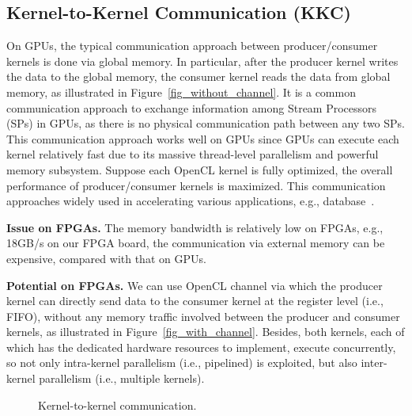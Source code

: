 \vspace{-1ex}
\subsection{Kernel-to-Kernel Communication (KKC)}
On GPUs, the typical communication approach between producer/consumer kernels is done via global memory. In particular, after the producer kernel writes the data to the global memory, the consumer kernel reads the data from global memory, as illustrated in Figure~\ref{fig_without_channel}. It is a common communication approach to exchange information among Stream Processors (SPs) in GPUs, as there is no physical communication path between any two SPs. This communication approach works well on GPUs since GPUs can execute each kernel relatively fast due to its massive thread-level parallelism and powerful memory subsystem. Suppose each OpenCL kernel is fully optimized, the overall performance of producer/consumer kernels is maximized. %
This communication approaches widely used in accelerating various applications, e.g., database~\cite{query_gpu_tods09, omnidb_vldb13}. 

{\bf Issue on FPGAs. }The memory bandwidth is relatively low on FPGAs, e.g., 18GB/s on our FPGA board, the communication via external memory can be expensive, compared with that on GPUs. 

{\bf Potential on FPGAs. }We can use OpenCL channel via which the producer kernel can directly send data to the consumer kernel at the register level (i.e., FIFO), without any memory traffic involved between the producer and consumer kernels, as illustrated in Figure~\ref{fig_with_channel}. Besides, both kernels, each of which has the dedicated hardware resources to implement, execute concurrently, so not only intra-kernel parallelism (i.e., pipelined) is exploited, but also inter-kernel parallelism (i.e., multiple kernels).  
\begin{figure}
	\centering
	\vspace{-2ex}	
	\caption{Kernel-to-kernel communication.} %
	\label{fig_kkc} 
	\vspace{-2ex}
\end{figure}  



